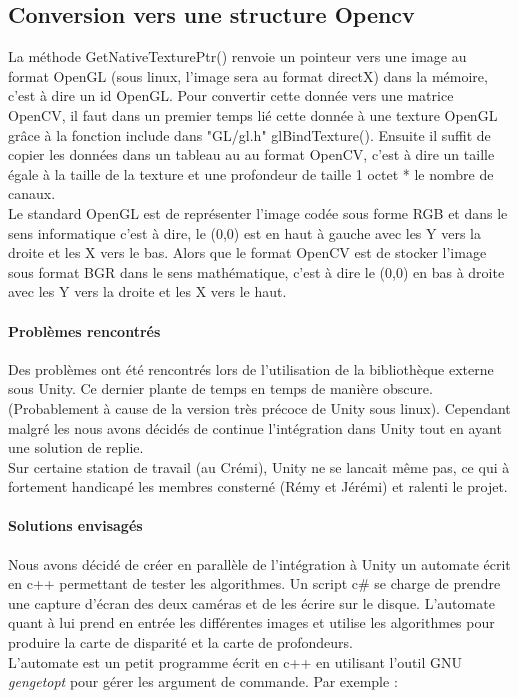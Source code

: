 \documentclass[12pt,a4paper]{report}
\begin{document}
\subsection{Conversion vers une structure Opencv}
La méthode GetNativeTexturePtr() renvoie un pointeur vers une image au format OpenGL (sous linux, l'image sera au format directX) dans la mémoire, c'est à dire un id OpenGL. Pour convertir cette donnée vers une matrice OpenCV, il faut dans un premier temps lié cette donnée à une texture OpenGL grâce à la fonction include dans "GL/gl.h" glBindTexture(). Ensuite il suffit de copier les données dans un tableau au au format OpenCV, c'est à dire un taille égale à la taille de la texture et une profondeur de taille 1 octet * le nombre de canaux.\\
Le standard OpenGL est de représenter l'image codée sous forme RGB et dans le sens informatique c'est à dire, le (0,0) est en haut à gauche avec les Y vers la droite et les X vers le bas. Alors que le format OpenCV est de stocker l'image sous format BGR dans le sens mathématique, c'est à dire le (0,0) en bas à droite avec les Y vers la droite et les X vers le haut.

\paragraph{Problèmes rencontrés}
Des problèmes ont été rencontrés lors de l'utilisation de la bibliothèque externe sous Unity. Ce dernier plante de temps en temps de manière obscure. (Probablement à cause de la version très précoce de Unity sous linux). Cependant malgré les nous avons décidés de continue l'intégration dans Unity tout en ayant une solution de replie.\\
Sur certaine station de travail (au Crémi), Unity ne se lancait même pas, ce qui à fortement handicapé les membres consterné (Rémy et Jérémi) et ralenti le projet.

\paragraph{Solutions envisagés}
Nous avons décidé de créer en parallèle de l'intégration à Unity un automate écrit en c++ permettant de tester les algorithmes. Un script c\# se charge de prendre une capture d'écran des deux caméras et de les écrire sur le disque. L'automate quant à lui prend en entrée les différentes images et utilise les algorithmes pour produire la carte de disparité et la carte de profondeurs.\\
L'automate est un petit programme écrit en c++ en utilisant l'outil GNU \textit{gengetopt} pour gérer les argument de commande. Par exemple :\\
\end{document}
